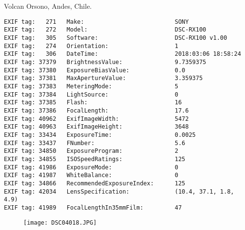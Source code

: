\section{\protect{}}
\noindent Volcan Orsono, Andes, Chile.
\noindent
\begin{lstlisting}
EXIF tag:   271   Make:                          SONY
EXIF tag:   272   Model:                         DSC-RX100
EXIF tag:   305   Software:                      DSC-RX100 v1.00
EXIF tag:   274   Orientation:                   1
EXIF tag:   306   DateTime:                      2018:03:06 18:58:24
EXIF tag: 37379   BrightnessValue:               9.7359375
EXIF tag: 37380   ExposureBiasValue:             0.0
EXIF tag: 37381   MaxApertureValue:              3.359375
EXIF tag: 37383   MeteringMode:                  5
EXIF tag: 37384   LightSource:                   0
EXIF tag: 37385   Flash:                         16
EXIF tag: 37386   FocalLength:                   17.6
EXIF tag: 40962   ExifImageWidth:                5472
EXIF tag: 40963   ExifImageHeight:               3648
EXIF tag: 33434   ExposureTime:                  0.0025
EXIF tag: 33437   FNumber:                       5.6
EXIF tag: 34850   ExposureProgram:               2
EXIF tag: 34855   ISOSpeedRatings:               125
EXIF tag: 41986   ExposureMode:                  0
EXIF tag: 41987   WhiteBalance:                  0
EXIF tag: 34866   RecommendedExposureIndex:      125
EXIF tag: 42034   LensSpecification:             (10.4, 37.1, 1.8, 4.9)
EXIF tag: 41989   FocalLengthIn35mmFilm:         47

\end{lstlisting}
\clearpage
\begin{figure}
\raggedleft
\texttt{[image: DSC04018.JPG]}
\end{figure}


\clearpage

